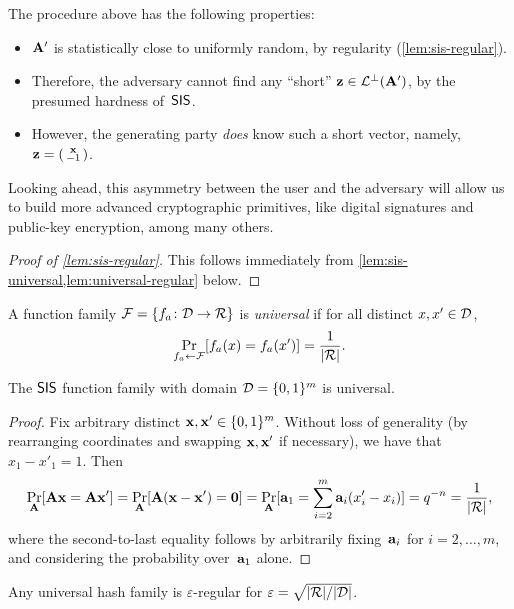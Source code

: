 \documentclass[11pt]{article}
\newcommand{\calR}{\ensuremath{\mathcal{R}}}
\begin{document}
The procedure above has the following properties:
\begin{itemize}[itemsep=0pt]
\item $\mathbf{A}'$ is statistically close to uniformly random, by
  regularity (\cref{lem:sis-regular}).
\item Therefore, the adversary cannot find any ``short''
  $\mathbf{z} \in \mathcal{L}^{\perp}(\mathbf{A}')$, by the presumed hardness of~$\mathsf{SIS}$.
\item However, the generating party \emph{does} know such a short
  vector, namely, $\mathbf{z} = \left(\begin{smallmatrix}\mathbf{x} \\ -1\end{smallmatrix}\right)$.
\end{itemize}
Looking ahead, this asymmetry between the user and the adversary will
allow us to build more advanced cryptographic primitives, like digital
signatures and public-key encryption, among many others.

\begin{proof}[Proof of \cref{lem:sis-regular}]
  This follows immediately from
  \cref{lem:sis-universal,lem:universal-regular} below.
\end{proof}

\begin{definition}
  A function family $\calF = \set{f_{a} \colon \calD \to \calR}$ is
  \emph{universal} if for all distinct $x, x' \in \mathcal{D}$,
  \[ \Pr_{f_a \gets \calF}[f_a(x)=f_a(x')] = \frac{1}{\abs{\calR}}
    . \]
\end{definition}

\begin{lemma}
  \label{lem:sis-universal}
  The $\mathsf{SIS}$ function family with domain $\mathcal{D}=\{0,1\}^{m}$ is
  universal.
\end{lemma}

\begin{proof}
  Fix arbitrary distinct $\mathbf{x}, \mathbf{x}' \in \{0,1\}^{m}$. Without loss of
  generality (by rearranging coordinates and swapping $\mathbf{x},\mathbf{x}'$
  if necessary), we have that $x_1-x'_1 = 1$. Then
  \[ \Pr_{\matA}[\matA\vecx = \matA\vecx'] =
    \Pr_{\matA}[\matA(\vecx-\vecx') = \veczero] = \Pr_{\matA}[\veca_1
    = \sum_{i=2}^{m} \veca_{i} (x'_{i}-x_{i})] = q^{-n} =
    \frac{1}{\abs{\calR}} ,
  \]
  where the second-to-last equality follows by arbitrarily
  fixing~$\mathbf{a}_{i}$ for $i=2,\ldots,m$, and considering the
  probability over~$\mathbf{a}_{1}$ alone.
\end{proof}

\begin{lemma}
  \label{lem:universal-regular}
  Any universal hash family is $\varepsilon$-regular for
  $\varepsilon=\sqrt{\abs{\calR}/{\abs{\calD}}}$.
\end{lemma}



\end{document}
